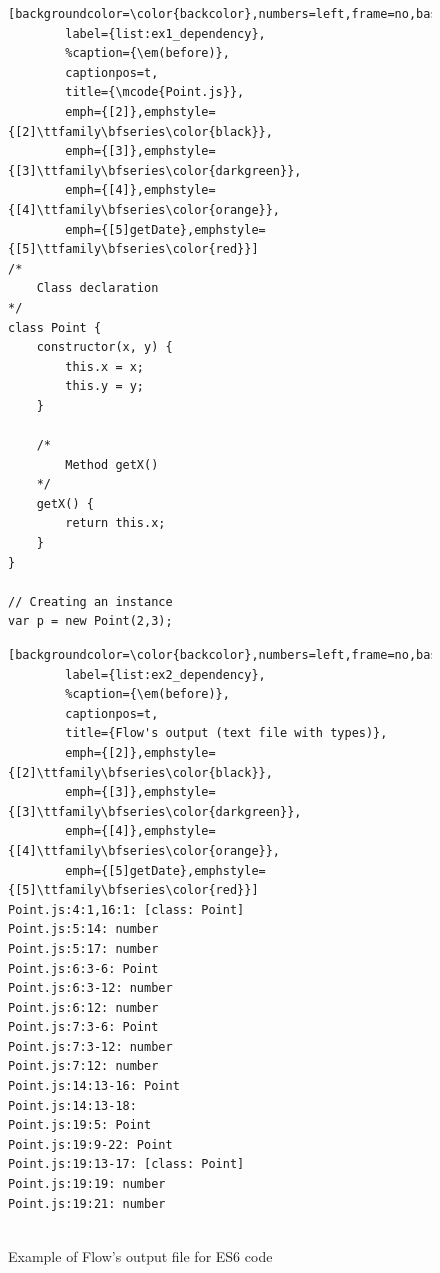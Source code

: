 \documentclass[review]{elsarticle}
\newcommand{\mcode}[1]{$\tt #1$}
\begin{document}
\begin{figure}[ht]
	\centering
	\begin{minipage}{.32\textwidth}
		\begin{lstlisting}[backgroundcolor=\color{backcolor},numbers=left,frame=no,basicstyle=\ttfamily\scriptsize,xleftmargin=5pt,
		label={list:ex1_dependency},
		%caption={\em(before)},
		captionpos=t,
		title={\mcode{Point.js}},
		emph={[2]},emphstyle={[2]\ttfamily\bfseries\color{black}},
		emph={[3]},emphstyle={[3]\ttfamily\bfseries\color{darkgreen}},
		emph={[4]},emphstyle={[4]\ttfamily\bfseries\color{orange}},
		emph={[5]getDate},emphstyle={[5]\ttfamily\bfseries\color{red}}]
/*
	Class declaration
*/
class Point {
	constructor(x, y) {
		this.x = x;
		this.y = y;
	}	
		
	/*
		Method getX()
	*/ 
	getX() {
		return this.x;
	}
}	
	
// Creating an instance 
var p = new Point(2,3);
		\end{lstlisting}
	\end{minipage}
	\begin{minipage}{.02\textwidth}
		\raggedleft{$\Rightarrow$}
	\end{minipage}
	\hspace{3pt}
	\begin{minipage}{.60\textwidth}
		\begin{lstlisting}[backgroundcolor=\color{backcolor},numbers=left,frame=no,basicstyle=\ttfamily\scriptsize,xleftmargin=5pt,
		label={list:ex2_dependency},
		%caption={\em(before)},
		captionpos=t,
		title={Flow's output (text file with types)},
		emph={[2]},emphstyle={[2]\ttfamily\bfseries\color{black}},
		emph={[3]},emphstyle={[3]\ttfamily\bfseries\color{darkgreen}},
		emph={[4]},emphstyle={[4]\ttfamily\bfseries\color{orange}},
		emph={[5]getDate},emphstyle={[5]\ttfamily\bfseries\color{red}}]
Point.js:4:1,16:1: [class: Point]
Point.js:5:14: number
Point.js:5:17: number
Point.js:6:3-6: Point
Point.js:6:3-12: number
Point.js:6:12: number
Point.js:7:3-6: Point
Point.js:7:3-12: number
Point.js:7:12: number
Point.js:14:13-16: Point
Point.js:14:13-18: 
Point.js:19:5: Point
Point.js:19:9-22: Point
Point.js:19:13-17: [class: Point]
Point.js:19:19: number
Point.js:19:21: number
		
		\end{lstlisting}
	\end{minipage}
	
	\centering\caption{Example of Flow's output file for ES6 code}
	\label{fig:example-flow-point-es6}
\end{figure}
\end{document}
